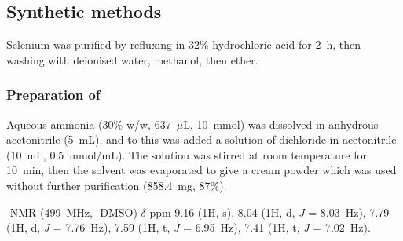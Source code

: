 \begin{refsection}

\subsection{Synthetic methods}

Selenium was purified by refluxing in 32\% hydrochloric acid for 2~h, then washing with deionised water, methanol, then ether.

\subsubsection{Preparation of }
Aqueous ammonia (30\% w/w, 637~$\mu$L, 10~mmol) was dissolved in anhydrous acetonitrile (5~mL), and to this was added a solution of dichloride  in acetonitrile (10~mL, 0.5~mmol/mL).
The solution was stirred at room temperature for 10~min, then the solvent was evaporated to give a cream powder which was used without further purification (858.4~mg, 87\%).\autocite{Weber1976}

-NMR (499~MHz, -DMSO) $\delta$ ppm 9.16 (1H, s), 8.04 (1H, d, \textit{J} = 8.03~Hz), 7.79 (1H, d, \textit{J} = 7.76~Hz), 7.59 (1H, t, \textit{J} = 6.95~Hz), 7.41 (1H, t, \textit{J} = 7.02~Hz).


\end{refsection}
